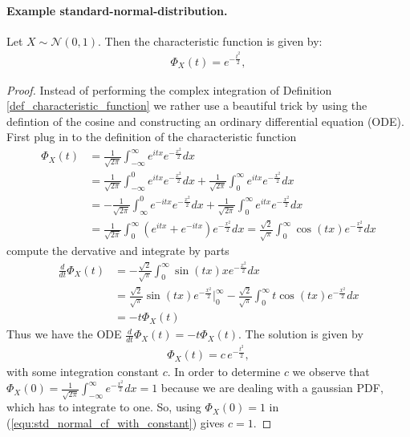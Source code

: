 \documentclass[10pt,a4paper]{article}
\begin{document}
\paragraph*{Example standard-normal-distribution.} Let $X \sim  \mathcal N(0,1)$. Then the characteristic function is given by:
\begin{align} \label{equ:std_normal_cf}
\Phi_X (t) =e ^{-\frac{t^2}{2}},
\end{align}
\begin{proof}
Instead of performing the complex integration of Definition \ref{def_characteristic_function} we rather use a beautiful trick by using the defintion of the cosine and constructing an ordinary differential equation (ODE). First plug in to the definition of the characteristic function
\begin{align*}
\Phi_X(t) &= \frac{1}{\sqrt{2\pi}}\int_{-\infty}^{\infty} e^{itx} e^{-\frac{x^2}{2}} dx \\
& = \frac{1}{\sqrt{2\pi}}\int_{-\infty}^{0} e^{itx} e^{-\frac{x^2}{2}} dx + \frac{1}{\sqrt{2\pi}}\int_{0}^{\infty} e^{itx} e^{-\frac{x^2}{2}} dx \\
& = -\frac{1}{\sqrt{2\pi}}\int_{\infty}^{0} e^{-itx} e^{-\frac{x^2}{2}} dx + \frac{1}{\sqrt{2\pi}}\int_{0}^{\infty} e^{itx} e^{-\frac{x^2}{2}} dx \\
& =  \frac{1}{\sqrt{2\pi}}\int_{0}^{\infty} \left( e^{itx} + e^{-itx} \right)e^{-\frac{x^2}{2}} dx  = \frac{\sqrt 2 }{\sqrt{\pi}}\int_{0}^{\infty} \cos(tx) e^{-\frac{x^2}{2}} dx
\end{align*}
compute the dervative and integrate by parts
\begin{align*}
\frac{d}{dt} \Phi_X (t) &= - \frac{\sqrt 2 }{\sqrt{\pi}} \int_{0}^{\infty} \sin (tx) x e^{-\frac{x^2}{2}}dx \\
  &=  \frac{\sqrt 2 } {\sqrt \pi}  \sin (tx)  e^{-\frac{x^2}{2}} \bigg \rvert_0^\infty  - \frac{\sqrt 2 }{\sqrt{\pi}} \int_{0}^{\infty} t \cos (tx)   e^{-\frac{x^2}{2}}dx \\
  &= - t \Phi_X(t)
\end{align*} 
Thus we have the ODE $\frac{d}{dt} \Phi_X (t) = - t \Phi_X (t)$. The solution  is given by
\begin{align} \label{equ:std_normal_cf_with_constant}
\Phi_X (t) = c\,e ^{-\frac{t^2}{2}},
\end{align}
with some integration constant $c$. In order to determine $c$ we observe that $\Phi_X(0) = \frac{1}{\sqrt{2\pi}}\int_{-\infty}^{\infty} e^{-\frac{x^2}{2}} dx = 1$ because we are dealing with a gaussian PDF, which has to integrate to one. So, using $\Phi_X(0)=1$ in (\ref{equ:std_normal_cf_with_constant}) gives $c=1$. 
\end{proof}
\end{document}
